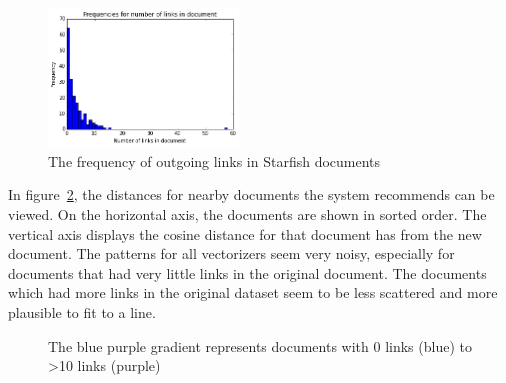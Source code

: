 \begin{figure}[h]
\centering
\includegraphics[width =0.45\textwidth]{images/link_histogram}
\caption{The frequency of outgoing links in Starfish documents}
\label{fig:link_histogram}
\end{figure}

In figure~\ref{fig:thresholds}, the distances for nearby documents the system recommends can be viewed. On the horizontal axis, the documents are shown in sorted order. The vertical axis displays the cosine distance for that document has from the new document. The patterns for all vectorizers seem very noisy, especially for documents that had very little links in the original document. The documents which had more links in the original dataset seem to be less scattered and more plausible to fit to a line.

\begin{figure}[h]
\caption{The blue purple gradient represents documents with 0 links (blue) to >10 links (purple)}
\label{fig:thresholds}
\end{figure}

